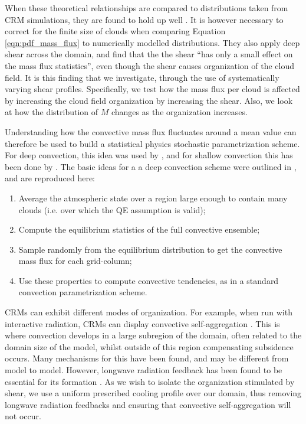 \documentclass[11pt,a4paper]{article}
\newcommand\todo[1]{\textbf{TODO: #1}}
\begin{document}
When these theoretical relationships are compared to distributions taken from CRM simulations, they are found to hold up well \parencite{CC2006II}. It is however necessary to correct for the finite size of clouds when comparing Equation \ref{eqn:pdf_mass_flux} to numerically modelled distributions. They also apply deep shear across the domain, and find that the the shear ``has only a small effect on the mass flux statistics'', even though the shear causes organization of the cloud field. 
It is this finding that we investigate, through the use of systematically varying shear profiles. Specifically, we test how the mass flux per cloud is affected by increasing the cloud field organization by increasing the shear. Also, we look at how the distribution of $M$ changes as the organization increases.

Understanding how the convective mass flux fluctuates around a mean value can therefore be used to build a statistical physics stochastic parametrization scheme. For deep convection, this idea was used by \cite{PC2008}, and for shallow convection this has been done by \cite{sakradzija2016stochastic}. The basic ideas for a a deep convection scheme were outlined in \cite{PC2008}, and are reproduced here:

\begin{enumerate}
    \item Average the atmospheric state over a region large enough to contain many clouds (i.e. over which the QE assumption is valid);
    \item Compute the equilibrium statistics of the full convective ensemble;
    \item Sample randomly from the equilibrium distribution to get the convective mass flux for each grid-column;
    \item Use these properties to compute convective tendencies, as in a standard convection parametrization scheme.
\end{enumerate}

CRMs can exhibit different modes of organization. For example, when run with interactive radiation, CRMs can display convective self-aggregation \parencite{wing2017convective}. 
This is where convection develops in a large subregion of the domain, often related to the domain size of the model, whilst outside of this region compensating subsidence occurs. Many mechanisms for this have been found, and may be different from model to model. 
However, longwave radiation feedback has been found to be essential for its formation \parencite{wing2017convective}. As we wish to isolate the organization stimulated by shear, we use a uniform prescribed cooling profile over our domain, thus removing longwave radiation feedbacks and ensuring that convective self-aggregation will not occur.
\end{document}
